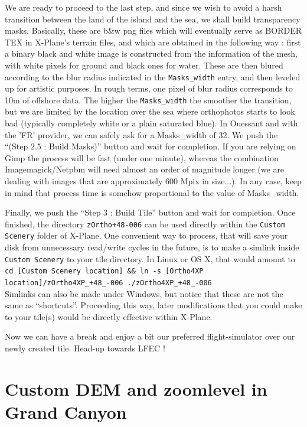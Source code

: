 \documentclass[12pt]{article}
\begin{document}
We are ready to proceed to the last step, and since we wish to avoid a harsh transition between the land of the island and the sea, we shall build transparency masks. Basically, these are b\&w png files which will eventually serve as BORDER TEX in X-Plane's terrain files, and which are obtained in the following way : first a binary black and white image is constructed from the information of the mesh, with white pixels for ground and black ones for water. These are then blured according to the blur radius indicated in the {\tt Masks\_width} entry, and then leveled up for artistic purposes. In rough terms, one pixel of blur radius corresponds to 10m of offshore data.
The higher the {\tt Masks\_width} the smoother the transition, but we are limited by the location over the sea where orthophotos starts to look bad (typically completely white or a plain saturated blue).
In Ouessant and with the 'FR' provider, we can safely ask for a Masks\_width of 32. We push the ``(Step 2.5 : Build Masks)'' button and wait for completion. If you are relying on Gimp the process will be fast (under one minute), whereas the combination Imagemagick/Netpbm will need almost an order of magnitude longer (we are dealing with images that are approximately 600 Mpix in size...).
In any case, keep in mind that process time is somehow proportional to the value of Masks\_width.

Finally, we push the ``Step 3 : Build Tile'' button and wait for completion. Once finished, the directory {\tt zOrtho+48-006} can be used directly within the {\tt Custom Scenery} folder of X-Plane. One convenient way to process, that will save your disk from unnecessary read/write cycles in the future, is to make a simlink inside {\tt Custom Scenery} to your tile directory. In Linux or OS X, that would amount to\\
{\tt \scriptsize cd [Custom Scenery location] \&\& ln -s [Ortho4XP location]/zOrtho4XP\_+48\_-006 ./zOrtho4XP\_+48\_-006}\\
Simlinks can also be made under Windows, but notice that these are not the same as ``shortcuts''.
Proceeding this way, later modifications that you could make to your tile(s) would be directly effective within X-Plane.


\bigskip

Now we can have a break and enjoy a bit our preferred flight-simulator over our newly created tile. Head-up towards LFEC !

\section{Custom DEM and zoomlevel in Grand Canyon}\label{grandcanyon}
\end{document}
